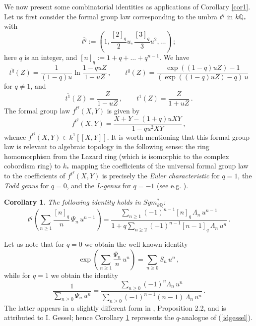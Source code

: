 \documentclass[a4paper,12pt]{amsart}
\newtheorem{cor}[equation]{Corollary}
\theoremstyle{definition}
\numberwithin{equation}{section}
\newcommand{\bQ}{{\mathbb Q}}
\begin{document}
We now present some combinatorial identities as applications of Corollary \ref{cor1}. Let us first consider the formal group law corresponding to the
umbra $t^q$ in $k\bQ_*$ with 
\[\overline{t^q}:=\left(1,\frac{[2]_q}{2}u,\frac{[3]_q}{3}u^2,\ldots\right)\,;\]
here $q$ is an integer, and $[n]_q:=1+q+\ldots+q^{n-1}$. We have
\[\overline{t^q}(Z)=\frac{1}{(1-q)u}\ln\frac{1-quZ}{1-uZ}\,,\qquad
t^q(Z)=\frac{\exp((1-q)uZ)-1}{(\exp((1-q)uZ)-q)\,u}\]
for $q\ne 1$, and 
\[\overline{t^1}(Z)=\frac{Z}{1-uZ}\,,\qquad t^1(Z)=\frac{Z}{1+uZ}\,.\]
The formal group law $f^{t^q}(X,Y)$ is given by
\[ f^{t^q}(X,Y)=\frac{X+Y-(1+q) u X Y}{1-q u^2 X Y}\,,\]
whence $f^{t^q}(X,Y)\in k^1[[X,Y]]$. It is worth mentioning that this formal group law is relevant to algebraic topology in the following sense: the ring homomorphism from the Lazard ring (which is isomorphic to the complex cobordism ring) to $k_*$ mapping the coefficients of the universal formal group law to the coefficients of $f^{t^q}(X,Y)$ is precisely the {\em Euler characteristic} for $q=1$, the {\em Todd genus} for $q=0$, and the {\em L-genus} for $q=-1$ (see e.g. \cite{mascc}). 
\begin{cor}\label{cor2}
The following identity holds in $Sym_{k{\mathbb Q}}^*$:
\[ t^q\left(\sum_{n\ge
1}\frac{[n]_q}{n}\,\varPsi_n\,u^{n-1}\right)=\frac{\sum_{n\ge
1}(-1)^{n-1}[n]_q\,\varLambda_n\,u^{n-1}}{1+q\sum_{n\ge
2}(-1)^{n-1}[n-1]_q\,\varLambda_n\,u^n}\,.\]
\end{cor}

Let us note that for $q=0$ we obtain the well-known identity
\[ \exp\left(\sum_{n\ge 1}\frac{\varPsi_n}{n}\,u^n\right)=\sum_{n\ge
0}S_n\,u^n\,,\]
while for $q=1$ we obtain the identity
\begin{equation}\label{idgessel}
 \frac{1}{\sum_{n\ge 0}\varPsi_n\,u^n}=\frac{\sum_{n\ge
0}(-1)^n\varLambda_n\,u^n}{\sum_{n\ge
0}(-1)^{n-1}(n-1)\,\varLambda_n\,u^n}\,.
\end{equation}
The latter appears in a slightly different form in \cite{sasijt}, Proposition 2.2, and is attributed to I. Gessel; hence Corollary \ref{cor2}
represents the $q$-analogue of (\ref{idgessel}).
\end{document}
